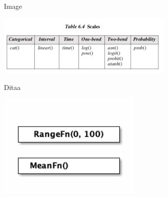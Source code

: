 \documentclass[10pt, presentation, colorlinks]{beamer}
\begin{document}
\begin{frame}[label={sec:org71fa437}]{Image}
\begin{center}
\includegraphics[height=3cm]{./img/algebra-scales.png}
\end{center}
\end{frame}

\begin{frame}[label={sec:org1f6e513}]{Ditaa}
\begin{center}
\includegraphics[width=7cm]{./img/ditaa-sample.png}
\end{center}
\end{frame}
\end{document}
